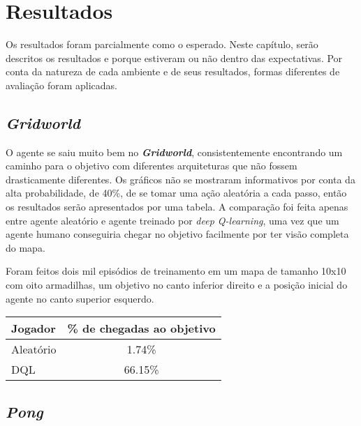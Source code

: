 
\chapter{Resultados}
\label{cap:resultados}

Os resultados foram parcialmente como o esperado.
Neste capítulo, serão descritos os resultados e porque estiveram ou não dentro das expectativas.
Por conta da natureza de cada ambiente e de seus resultados, formas diferentes de avaliação foram aplicadas.

\section{\textit{Gridworld}}
\label{sec:res_gridworld}

O agente se saiu muito bem no \textbf{\textit{Gridworld}}, consistentemente encontrando um caminho para o objetivo com diferentes arquiteturas que não fossem drasticamente diferentes.
Os gráficos não se mostraram informativos por conta da alta probabilidade, de 40\%, de se tomar uma ação aleatória a cada passo, então os resultados serão apresentados por uma tabela.
A comparação foi feita apenas entre agente aleatório e agente treinado por \textit{deep Q-learning}, uma vez que um agente humano conseguiria chegar no objetivo facilmente por ter visão completa do mapa.

Foram feitos dois mil episódios de treinamento em um mapa de tamanho 10x10 com oito armadilhas, um objetivo no canto inferior direito e a posição inicial do agente no canto superior esquerdo.

\begin{center}
\begin{tabular}{l c}
\hline
Jogador & \% de chegadas ao objetivo \\
\hline
Aleatório & 1.74\% \\
DQL & 66.15\% \\
\hline
\end{tabular}
\label{table:gridworld_score}
\end{center}

\section{\textit{Pong}}
\label{sec:res_pong}

